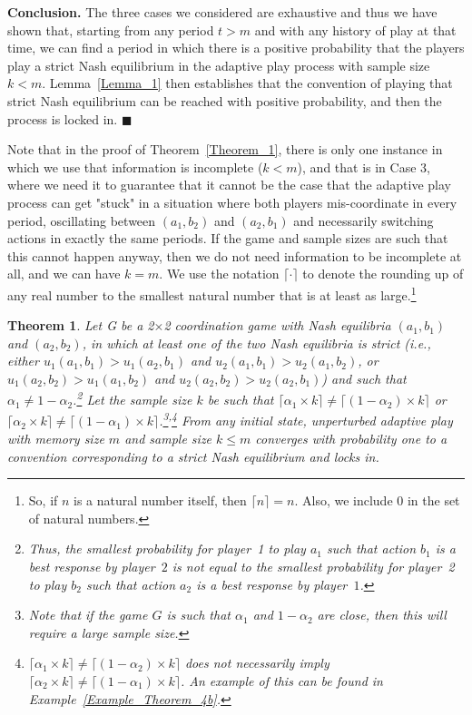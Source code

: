 \documentclass[11.5pt]{article}
\newtheorem{theorem}{Theorem}
\begin{document}
{\bf Conclusion.} The three cases we considered are exhaustive and thus we have shown that, starting  from any period $t>m$ and with any history of play at that time, we can find a period in which there is a positive probability that the players play a strict Nash equilibrium in the adaptive play process with sample size $k<m$. Lemma~\ref{Lemma_1} then establishes that the convention of playing that strict Nash equilibrium can be reached with positive probability, and then the process is locked in.
$\blacksquare$

\medskip
Note that in the proof of Theorem~\ref{Theorem_1}, there is only one instance in which we use that information is incomplete ($k<m$), and that is in Case 3, where we need it to guarantee that it cannot be the case that the adaptive play process can get "stuck" in a situation where both players mis-coordinate in every period, oscillating between $(a_1,b_2)$ and $(a_2,b_1)$ and necessarily switching actions in exactly the same periods. 
%
If the game and sample sizes are such that this cannot happen anyway, then we do not need information to be incomplete at all, and we can have $k=m$. 
We use the notation $\lceil\cdot\rceil$ to denote the rounding up of any real number to the smallest natural number that is at least as large.\footnote{So, if $n$ is a natural number itself, then $\lceil n\rceil=n$. Also, we include $0$ in the set of natural numbers.}





\begin{theorem}\label{Theorem_2}
Let G be a 2$\times$2 coordination game with Nash equilibria $(a_1,b_1)$ and $(a_2,b_2)$,  
in which at least one of the two Nash equilibria is strict (i.e., either $u_1(a_1,b_1) > u_1(a_2,b_1)$ and $u_2(a_1,b_1) > u_2(a_1,b_2)$, or $u_1(a_2,b_2) > u_1(a_1,b_2)$ and $u_2(a_2,b_2) > u_2(a_2,b_1)$)  
%
and such that $\alpha_1\neq 1-\alpha_2$.\footnote{Thus, the smallest probability for player~1 to play $a_1$ such that action $b_1$ is a best response by player~$2$ is not equal to the smallest probability for player~2 to play $b_2$ such that action $a_2$ is a best response by player~$1$.} 
%
Let the sample size $k$ be such that $\lceil\alpha_1\times k\rceil \neq \lceil (1-\alpha_2)\times k\rceil$ or $\lceil\alpha_2\times k\rceil \neq \lceil (1-\alpha_1)\times k\rceil$.\footnote{Note that if the game $G$ is such that $\alpha_1$ and $1-\alpha_2$ are close, then this will require a large sample size.}\textsuperscript{,}\footnote{$\lceil\alpha_1\times k\rceil \neq \lceil (1-\alpha_2)\times k\rceil$ does not necessarily imply $\lceil\alpha_2\times k\rceil \neq \lceil (1-\alpha_1)\times k\rceil$. An example of this can be found in Example~\ref{Example_Theorem_4b}.}
From any initial state, unperturbed adaptive play with memory size $m$ and sample size $k \leq m$ converges with probability one to a convention corresponding to a strict Nash equilibrium and locks in.
\end{theorem}
\end{document}

